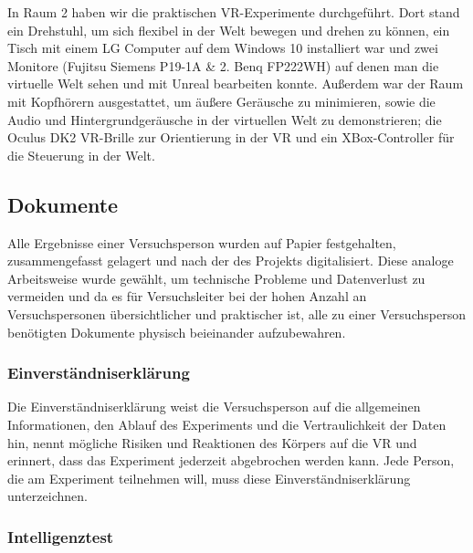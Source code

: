 \documentclass{Bericht}
\begin{document}
In Raum 2 haben wir die praktischen VR-Experimente durchgeführt. Dort stand ein Drehstuhl, um sich flexibel in der Welt bewegen und drehen zu können, ein Tisch mit einem LG Computer auf dem  Windows 10 installiert war und zwei Monitore (Fujitsu Siemens P19-1A \& 2. Benq FP222WH) auf denen man die virtuelle Welt sehen und mit Unreal bearbeiten konnte. Außerdem war der Raum mit Kopfhörern ausgestattet, um äußere Geräusche zu minimieren, sowie die Audio und Hintergrundgeräusche in der virtuellen Welt zu demonstrieren; die Oculus DK2 VR-Brille zur Orientierung in der VR und ein XBox-Controller für die Steuerung in der Welt.

\label{subsec:dokumente}
\subsection{Dokumente}
Alle Ergebnisse einer Versuchsperson wurden auf Papier festgehalten, zusammengefasst gelagert und nach der des Projekts digitalisiert. Diese analoge Arbeitsweise wurde gewählt, um technische Probleme und Datenverlust zu vermeiden und da es für Versuchsleiter bei der hohen Anzahl an Versuchspersonen übersichtlicher und praktischer ist, alle zu einer Versuchsperson benötigten Dokumente physisch beieinander aufzubewahren.

\subsubsection{Einverständniserklärung}

Die Einverständniserklärung weist die Versuchsperson auf die allgemeinen Informationen, den Ablauf des Experiments und die Vertraulichkeit der Daten hin, nennt mögliche Risiken und Reaktionen des Körpers auf die VR und erinnert, dass das Experiment jederzeit abgebrochen werden kann. Jede Person, die am Experiment teilnehmen will, muss diese Einverständniserklärung unterzeichnen.

\subsubsection{Intelligenztest}
	
\end{document}
